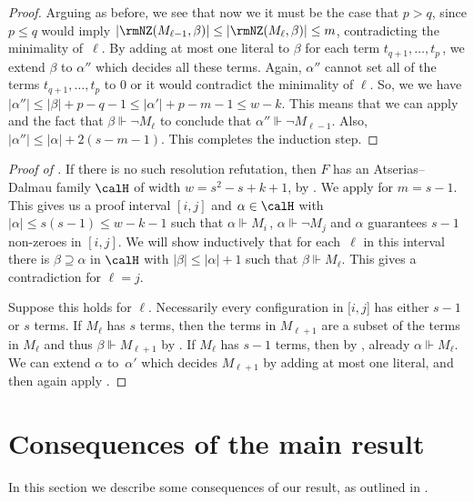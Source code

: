 \begin{proof}
Arguing as before, we see that now we it must be the case that $p>q$,
since $p \le q$ would imply $|\rmNZ(M_{\ell-1}, \beta)| \le |\rmNZ(M_\ell, \beta)| \le m$, contradicting the minimality of~$\ell$.
By adding at most one literal to $\beta$ for each term $t_{q+1}, \dots, t_p$\,, 
we extend $\beta$ to $\alpha''$ which decides all these terms. Again,
$\alpha''$ cannot set all of the terms $t_{q+1}, \dots, t_p$ 
to $0$ or it would contradict the minimality of $\ell$.
So, we we have $|\alpha''| \le |\beta| + p-q-1 \le |\alpha'|+p-m-1
\le w-k$.
This means that we can apply  
and the fact that $\beta \Vdash \neg M_\ell$ to conclude that $\alpha'' \Vdash \neg M_{\ell-1}$.
Also, $|\alpha''| \le |\alpha|+2(s-m-1)$. This completes the induction step.
\end{proof}

\begin{proof}[Proof of ]
If there is no such resolution refutation, then $F$ has an Atserias--Dalmau
family $\calH$ of width $w=s^2-s+k+1$, by .
We apply  for $m=s-1$. 
This gives us 
a proof interval $[i, j]$
and $\alpha \in \calH$
with $|\alpha| \le s(s-1) \le w-k-1$ such that
$\alpha \Vdash M_i$\,, $\alpha \Vdash \neg M_j$
and $\alpha$ guarantees $s-1$ non-zeroes in $[i,j]$. 
We will show inductively that for each~$\ell$ in this interval
there is $\beta \supseteq \alpha$ in $\calH$ with $|\beta| \le |\alpha|+1$
such that
$\beta \Vdash M_{\ell}$. This gives a contradiction for $\ell = j$.

Suppose this holds for $\ell$. Necessarily every
configuration in $[i,j$] has either $s-1$ or $s$ terms.
 If $M_{\ell}$ has $s$ terms, then the terms
in $M_{\ell+1}$ are a subset of the terms in $M_{\ell}$ and
thus $\beta \Vdash M_{\ell+1}$ by 
.
If $M_{\ell}$ has $s-1$ terms, then by 
, already $\alpha \Vdash M_{\ell}$.
We can extend $\alpha$ to~$\alpha'$ which decides $M_{\ell+1}$
by adding at most one literal, and then again apply
.
\end{proof}




%
\section{Consequences of the main result}\label{sec:conseq}
%


In this section we describe some consequences of our result,
as outlined in .
 
